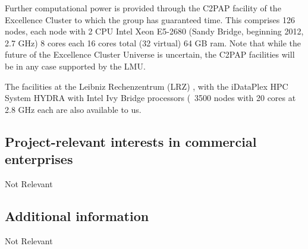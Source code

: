 \documentclass[10pt,fleqn,twoside]{article}
\newcommand{\Tcol}{\color{blue}}
\begin{document}
Further computational power is provided through the C2PAP facility of the Excellence Cluster to which
the group has guaranteed time. This comprises 126 nodes, each node with 2 CPU Intel Xeon E5-2680 (Sandy
Bridge, beginning 2012, 2.7 GHz) 8 cores each 16 cores total (32
virtual) 64 GB ram. Note that while the future of the Excellence
Cluster Universe is uncertain, the C2PAP facilities will be in any
case supported by the LMU. 

The facilities at the Leibniz Rechenzentrum (LRZ) , with the iDataPlex
HPC System HYDRA with Intel Ivy Bridge processors (~3500 nodes with 20
cores at 2.8 GHz each are also available to us.

\subsection{\Tcol Project-relevant interests in commercial enterprises}

Not Relevant


\subsection{\Tcol Additional information}

Not Relevant
\end{document}
